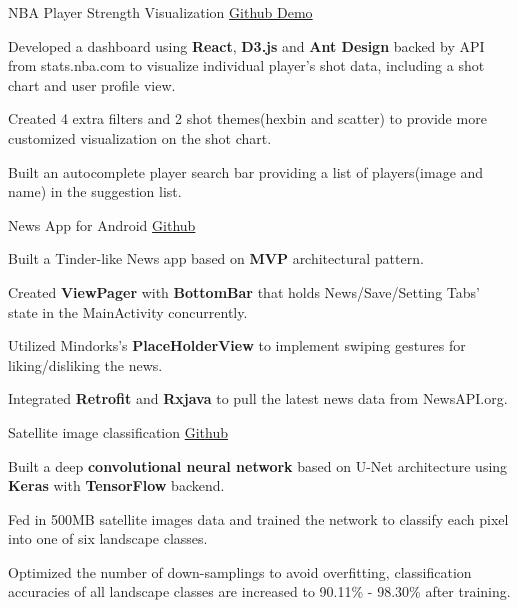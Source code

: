 \begin{cvprojects}
    
    \cvproject
    {NBA Player Strength Visualization}
    {\href{http://github.com/wuhxxx/nba-shotchart}{Github  }}
    {\href{http://nba-shotchart.s3-website-us-west-1.amazonaws.com}{  Demo}}
    {
      \begin{cvitems}
        \item {Developed a dashboard using \textbf{React}, \textbf{D3.js} and \textbf{Ant Design} backed by API from stats.nba.com to visualize individual player’s shot data, including a shot chart and user profile view.}
        \item {Created 4 extra filters and 2 shot themes(hexbin and scatter) to provide more customized visualization on the shot chart.}
        \item {Built an autocomplete player search bar providing a list of players(image and name) in the suggestion list.}
      \end{cvitems}
    }

    
    \cvproject
    {News App for Android}
    {\href{https://github.com/wuhxxx/news-app}{Github}}
    {}
    {
      \begin{cvitems}
        \item {Built a Tinder-like News app based on \textbf{MVP} architectural pattern.}
        \item {Created \textbf{ViewPager} with \textbf{BottomBar} that holds News/Save/Setting Tabs’ state in the MainActivity concurrently.}
        \item {Utilized Mindorks’s \textbf{PlaceHolderView} to implement swiping gestures for liking/disliking the news.}
        \item{Integrated \textbf{Retrofit} and \textbf{Rxjava} to pull the latest news data from NewsAPI.org.}
      \end{cvitems}
    }

    
    \cvproject
    {Satellite image classification}
    {\href{https://github.com/wuhxxx/satellite-image-unet}{Github}}
    {}
    {
      \begin{cvitems}
        \item {Built a deep \textbf{convolutional neural network} based on U-Net architecture using \textbf{Keras} with \textbf{TensorFlow} backend.}
        \item {Fed in 500MB satellite images data and trained the network to classify each pixel into one of six landscape classes.}
        \item {Optimized the number of down-samplings to avoid overfitting, classification accuracies of all landscape classes are increased to 90.11\% - 98.30\% after training. }
      \end{cvitems}
    }
    

\end{cvprojects}
